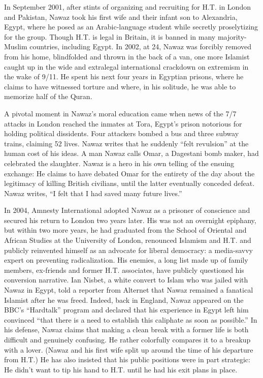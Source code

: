 In September 2001, after stints of organizing and recruiting for H.T. in
London and Pakistan, Nawaz took his first wife and their infant son to
Alexandria, Egypt, where he posed as an Arabic-language student while
secretly proselytizing for the group. Though H.T. is legal in Britain,
it is banned in many majority-Muslim countries, including Egypt. In
2002, at 24, Nawaz was forcibly removed from his home, blindfolded and
thrown in the back of a van, one more Islamist caught up in the wide and
extralegal international crackdown on extremism in the wake of 9/11. He
spent his next four years in Egyptian prisons, where he claims to have
witnessed torture and where, in his solitude, he was able to memorize
half of the Quran.

A pivotal moment in Nawaz's moral education came when news of the 7/7
attacks in London reached the inmates at Tora, Egypt's prison notorious
for holding political dissidents. Four attackers bombed a bus and three
subway trains, claiming 52 lives. Nawaz writes that he suddenly ``felt
revulsion'' at the human cost of his ideas. A man Nawaz calls Omar, a
Dagestani bomb maker, had celebrated the slaughter. Nawaz is a hero in
his own telling of the ensuing exchange: He claims to have debated Omar
for the entirety of the day about the legitimacy of killing British
civilians, until the latter eventually conceded defeat. Nawaz writes,
``I felt that I had saved many future lives.''

In 2004, Amnesty International adopted Nawaz as a prisoner of conscience
and secured his return to London two years later. His was not an
overnight epiphany, but within two more years, he had graduated from the
School of Oriental and African Studies at the University of London,
renounced Islamism and H.T. and publicly reinvented himself as an
advocate for liberal democracy: a media-savvy expert on preventing
radicalization. His enemies, a long list made up of family members,
ex-friends and former H.T. associates, have publicly questioned his
conversion narrative. Ian Nisbet, a white convert to Islam who was
jailed with Nawaz in Egypt, told a reporter from Alternet that Nawaz
remained a fanatical Islamist after he was freed. Indeed, back in
England, Nawaz appeared on the BBC's ``Hardtalk'' program and declared
that his experience in Egypt left him convinced ``that there is a need
to establish this caliphate as soon as possible.'' In his defense, Nawaz
claims that making a clean break with a former life is both difficult
and genuinely confusing. He rather colorfully compares it to a breakup
with a lover. (Nawaz and his first wife split up around the time of his
departure from H.T.) He has also insisted that his public positions were
in part strategic: He didn't want to tip his hand to H.T. until he had
his exit plans in place.


